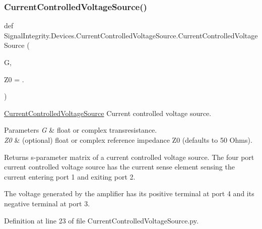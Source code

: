 \subsubsection{\texorpdfstring{Current\+Controlled\+Voltage\+Source()}{CurrentControlledVoltageSource()}}
{\footnotesize\ttfamily def Signal\+Integrity.\+Devices.\+Current\+Controlled\+Voltage\+Source.\+Current\+Controlled\+Voltage\+Source (\begin{DoxyParamCaption}\item[{}]{G,  }\item[{}]{Z0 = {.} }\end{DoxyParamCaption})}



\hyperlink{namespaceSignalIntegrity_1_1Devices_1_1CurrentControlledVoltageSource}{Current\+Controlled\+Voltage\+Source} Current controlled voltage source. 


\begin{DoxyParams}{Parameters}
{\em G} & float or complex transresistance. \\
\hline
{\em Z0} & (optional) float or complex reference impedance Z0 (defaults to 50 Ohms). \\
\hline
\end{DoxyParams}
\begin{DoxyReturn}{Returns}
s-\/parameter matrix of a current controlled voltage source. The four port current controlled voltage source has the current sense element sensing the current entering port 1 and exiting port 2.
\end{DoxyReturn}
The voltage generated by the amplifier has its positive terminal at port 4 and its negative terminal at port 3. 

Definition at line 23 of file Current\+Controlled\+Voltage\+Source.\+py.

